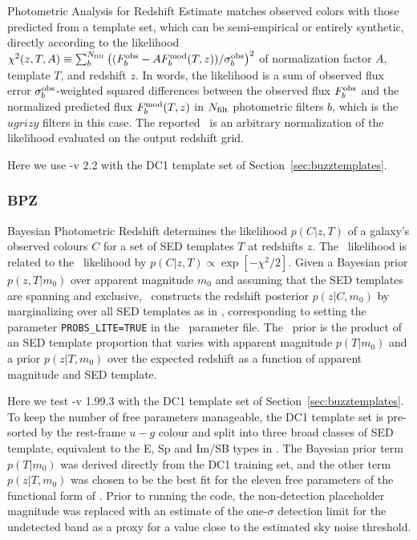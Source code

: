 Photometric Analysis for Redshift Estimate \citep[\lephare\footnote{\url{http://www.cfht.hawaii.edu/~arnouts/lephare.html}},][]{Arnouts:99,Ilbert:06} matches observed colors with those predicted from a template set, which can be semi-empirical or entirely synthetic, directly according to the likelihood $\chi^{2}(z, T, A) \equiv \sum_{b}^{N_{\rm{filt}}} \left((F^{\rm{obs}}_{b} - A F^{\rm{mod}}_{b}(T, z)) / \sigma^{\rm{obs}}_{b}\right)^{2}$ of normalization factor $A$, template $T$, and redshift $z$.
In words, the likelihood is a sum of observed flux error $\sigma_{b}^{\rm{obs}}$-weighted squared differences between the observed flux $F^{\rm{obs}}_{b}$ and the normalized predicted flux $F^{\rm{mod}}_{b}(T, z)$ in $N_{\rm{filt}}$ photometric filters $b$, which is the \lsst\ $ugrizy$ filters in this case.
The reported \pzpdf\ is an arbitrary normalization of the likelihood evaluated on the output redshift grid.

Here we use \lephare-v 2.2 with the DC1 template set of Section~\ref{sec:buzztemplates}.

\subsubsection{BPZ}
\label{sec:BPZ}

Bayesian Photometric Redshift \citep[\bpz\footnote{\url{http://www.stsci.edu/~dcoe/BPZ/}},][]{Benitez:00} determines the likelihood $p(C \vert z, T)$ of a galaxy's observed colours $C$ for a set of SED templates $T$ at redshifts $z$.
The \bpz\ likelihood is related to the \chisq\ likelihood by $p(C \vert z, T) \propto \exp[- \chi^{2} / 2]$.
Given a Bayesian prior $p(z, T \vert m_{0})$ over apparent magnitude $m_0$ and assuming that the SED templates are spanning and exclusive, \bpz\ constructs the redshift posterior $p(z \vert C, m_0)$ by marginalizing over all SED templates as in \citep[Eq.~3 from][]{Benitez:00}, corresponding to setting the parameter \texttt{PROBS\_LITE=TRUE} in the \bpz\ parameter file.
The \bpz\ prior is the product of an SED template proportion that varies with apparent magnitude $p(T \vert m_{0})$ and a prior $p(z \vert T, m_{0})$ over the expected redshift as a function of apparent magnitude and SED template.

Here we test \bpz-v 1.99.3 with the DC1 template set of Section~\ref{sec:buzztemplates}.
To keep the number of free parameters manageable, the DC1 template set is pre-sorted by the rest-frame $u-g$ colour and split into three broad classes of SED template, equivalent to the E, Sp and Im/SB types in .
The Bayesian prior term $p(T \vert m_{0})$ was derived directly from the DC1 training set, and the other term $p(z \vert T, m_{0})$ was chosen to be the best fit for the eleven free parameters of the functional form of \citet{Benitez:00}.
Prior to running the code, the non-detection placeholder magnitude was replaced with an estimate of the one-$\sigma$ detection limit for the undetected band as a proxy for a value close to the estimated sky noise threshold.


